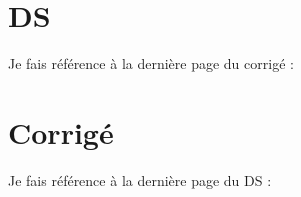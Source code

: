 \documentclass{book}
\begin{document}
\chapter{DS}

\lipsum[1-15]

Je fais référence à la dernière page du corrigé : \pageref{labelCorrige}
\label{labelDS}


\chapter{Corrigé}\setcounter{page}{1}

\lipsum[1-30]

Je fais référence à la dernière page du DS : \pageref{labelDS}
\label{labelCorrige}
\end{document}
